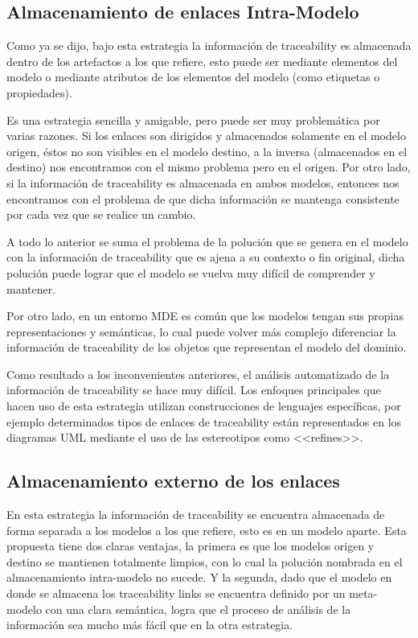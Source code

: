 \documentclass[a4paper,12pt,oneside]{book}
\begin{document}
\subsection{Almacenamiento de enlaces Intra-Modelo}

Como ya se dijo, bajo esta estrategia la información de traceability es almacenada dentro de los artefactos a los que refiere, esto puede ser mediante elementos del modelo o mediante atributos de los elementos del modelo (como etiquetas o propiedades). 

Es una estrategia sencilla y amigable, pero puede ser muy problemática por varias razones. Si los enlaces son dirigidos y almacenados solamente en el modelo origen, éstos no son visibles en el modelo destino, a la inversa (almacenados en el destino) nos encontramos con el mismo problema pero en el origen. Por otro lado, si la información de traceability es almacenada en ambos modelos, entonces nos encontramos con el problema de que dicha información se mantenga consistente por cada vez que se realice un cambio.

A todo lo anterior se suma el problema de la polución que se genera en el modelo con la información de traceability que es ajena a su contexto o fin original, dicha polución puede lograr que el modelo se vuelva muy difícil de comprender y mantener. 

Por otro lado, en un entorno MDE es común que los modelos tengan sus propias representaciones y semánticas, lo cual puede volver más complejo diferenciar la información de traceability de los objetos que representan el modelo del dominio. 

Como resultado a los inconvenientes anteriores, el análisis automatizado de la información de traceability se hace muy difícil. Los enfoques principales que hacen uso de esta estrategia utilizan construcciones  de lenguajes específicas, por ejemplo determinados tipos de enlaces de traceability están representados en los diagramas UML mediante el uso de las estereotipos como <<refines>>.

\subsection{Almacenamiento externo de los enlaces}

En esta estrategia la información de traceability se encuentra almacenada de forma separada a los modelos a los que refiere, esto es en un modelo aparte. Esta propuesta tiene dos claras ventajas, la primera es que los modelos origen y destino se mantienen totalmente limpios, con lo cual la polución nombrada en el almacenamiento intra-modelo no sucede. Y la segunda, dado que el modelo en donde se almacena los traceability links se encuentra definido por un meta-modelo con una clara semántica, logra que el proceso de análisis de la información sea mucho más fácil que en la otra estrategia.
\end{document}
